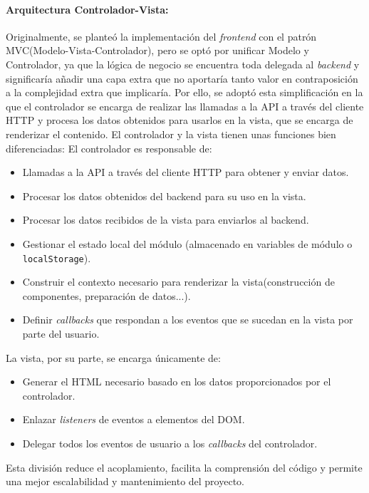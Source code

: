 \paragraph{Arquitectura Controlador-Vista:} Originalmente, se planteó la implementación del \textit{frontend} con el patrón MVC(Modelo-Vista-Controlador), pero se optó por unificar Modelo y Controlador, ya que la lógica de negocio se encuentra toda delegada al \textit{backend} y significaría añadir una capa extra que no aportaría tanto valor en contraposición a la complejidad extra que implicaría. Por ello, se adoptó esta simplificación en la que el controlador se encarga de realizar las llamadas a la API a través del cliente HTTP y procesa los datos obtenidos para usarlos en la vista, que se encarga de renderizar el contenido. El controlador y la vista tienen unas funciones bien diferenciadas:
El controlador es responsable de:

\begin{itemize}
    \item Llamadas a la API a través del cliente HTTP para obtener y enviar datos.
    \item Procesar los datos obtenidos del backend para su uso en la vista.
    \item Procesar los datos recibidos de la vista para enviarlos al backend.
    \item Gestionar el estado local del módulo (almacenado en variables de módulo o \texttt{localStorage}).
    \item Construir el contexto necesario para renderizar la vista(construcción de componentes, preparación de datos...).
    \item Definir \textit{callbacks} que respondan a los eventos que se sucedan en la vista por parte del usuario.
\end{itemize}

La vista, por su parte, se encarga únicamente de:

\begin{itemize}
    \item Generar el HTML necesario basado en los datos proporcionados por el controlador.
    \item Enlazar \textit{listeners} de eventos a elementos del DOM.
    \item Delegar todos los eventos de usuario a los \textit{callbacks} del controlador.
\end{itemize}

Esta división reduce el acoplamiento, facilita la comprensión del código y permite una mejor escalabilidad y mantenimiento del proyecto.

